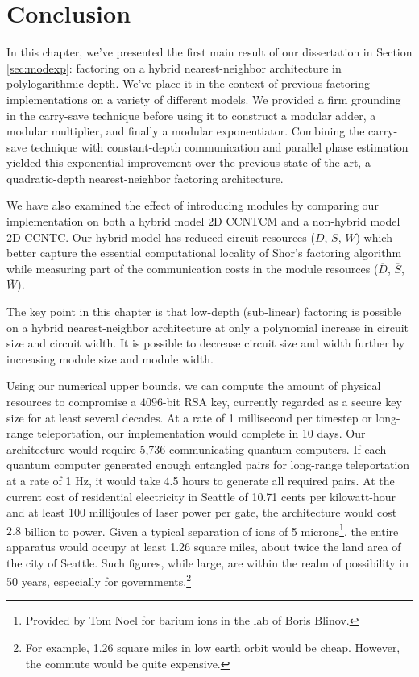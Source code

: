 \section{Conclusion}
\label{sec:fpl-conclude}

In this chapter, we've presented the first main result of
our dissertation in Section \ref{sec:modexp}:
factoring on a hybrid nearest-neighbor architecture in polylogarithmic depth.
We've place it in the context of previous factoring implementations on a
variety of different models. We provided a firm grounding
in the carry-save technique before using it to construct
a modular adder, a modular multiplier, and finally a
modular exponentiator. Combining the carry-save technique
with constant-depth
communication and parallel phase estimation yielded
this exponential improvement over the previous
state-of-the-art, a quadratic-depth nearest-neighbor
factoring architecture.

We have also examined the
effect of introducing modules by comparing our
implementation on both a hybrid model \textsf{2D CCNTCM}
and a non-hybrid model \textsf{2D CCNTC}.
Our hybrid model has reduced circuit resources
($D$, $S$, $W$) which better
capture the essential computational locality of Shor's factoring
algorithm while measuring part of the communication
costs in the module resources ($\overline{D}$, $\overline{S}$, $\overline{W}$).

The key point in this chapter is that
low-depth (sub-linear) factoring is possible
on a hybrid nearest-neighbor architecture
at only a polynomial increase in circuit size
and 
circuit width. It is possible to decrease
circuit size and width further by increasing
module size and module width.

Using our numerical
upper bounds, we can compute the amount of
physical resources to compromise a $4096$-bit
RSA key, currently regarded as a secure key size
for at least several decades. At a rate of
1 millisecond per timestep or long-range
teleportation, our implementation would
complete in 10 days.
 Our architecture
would require 5,736 communicating quantum
computers. If each quantum computer generated
enough entangled pairs for long-range
teleportation at a rate of 1 Hz, it would
take 4.5 hours to generate all required pairs.
At the current cost of residential electricity 
in Seattle of 10.71 cents per kilowatt-hour and
at least 100 millijoules of laser
power per gate,
the architecture would cost $2.8$ billion
to power.
 Given a typical
separation of ions of 5 microns\footnote{Provided by Tom Noel for barium ions in the lab of Boris Blinov.},
the entire apparatus would occupy at least 1.26
square miles, about twice the land area of the city
of Seattle. Such figures, while large, are
within the realm of possibility in 50 years, especially
for governments.\footnote{For example,
1.26 square miles in low earth orbit would be cheap.
However, the commute would be quite expensive.}

